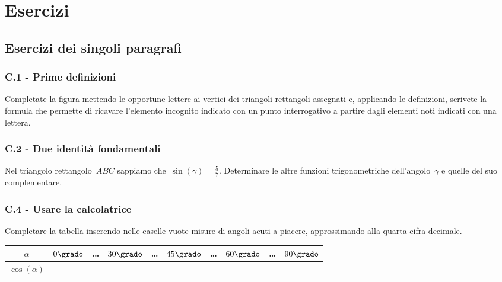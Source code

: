 
\section{Esercizi}
\subsection{Esercizi dei singoli paragrafi}
\subsubsection*{C.1 - Prime definizioni}

\begin{esercizio}
\label{ese:C.1}
Completate la figura mettendo le opportune lettere ai vertici dei triangoli rettangoli assegnati e, applicando le definizioni, scrivete la formula
che permette di ricavare l'elemento incognito indicato con un punto interrogativo a partire dagli elementi noti indicati con una lettera.
\begin{center}
 
\end{center}

\end{esercizio}

\subsubsection*{C.2 - Due identità fondamentali}

\begin{esercizio}
\label{ese:C.2}
Nel triangolo rettangolo~$ABC$ sappiamo che~$\sin(\gamma)=\frac{5}{7}$.
Determinare le altre funzioni trigonometriche dell'angolo~$\gamma$ e quelle del suo complementare.
\end{esercizio}

\subsubsection*{C.4 - Usare la calcolatrice}

\begin{esercizio}
\label{ese:C.3}
Completare la tabella inserendo nelle caselle vuote misure di angoli acuti a piacere, approssimando alla quarta cifra decimale.
\begin{center}
\begin{tabular}{cccccccccc}
\toprule
$\alpha$ & $0\grado$ & \ldots & $30\grado$ & \ldots & $45\grado$ & \ldots & $60\grado$ & \ldots & $90\grado$\\
\midrule
$\cos(\alpha)$ & & & & & & & & & \\
\bottomrule
\end{tabular}
\end{center}
\end{esercizio}

